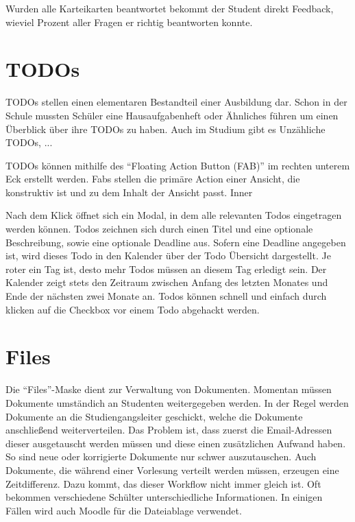Wurden alle Karteikarten beantwortet bekommt der Student direkt Feedback, wieviel Prozent aller Fragen er richtig beantworten konnte.


\section{TODOs}\label{sec:TODOs} %
TODOs stellen einen elementaren Bestandteil einer Ausbildung dar.
Schon in der Schule mussten Schüler eine Hausaufgabenheft oder Ähnliches führen um einen Überblick über ihre TODOs zu haben.
Auch im Studium gibt es Unzähliche TODOs, ...

TODOs können mithilfe des \enquote{Floating Action Button (FAB)} im rechten unterem Eck erstellt werden. %
Fabs stellen die primäre Action einer Ansicht, die konstruktiv ist und zu dem Inhalt der Ansicht passt.
Inner


Nach dem Klick öffnet sich ein Modal, in dem alle relevanten Todos eingetragen werden können.
Todos zeichnen sich durch einen Titel und eine optionale Beschreibung, sowie eine optionale Deadline aus.
Sofern eine Deadline angegeben ist, wird dieses Todo in den Kalender über der Todo Übersicht dargestellt.
Je roter ein Tag ist, desto mehr Todos müssen an diesem Tag erledigt sein.
Der Kalender zeigt stets den Zeitraum zwischen Anfang des letzten Monates und Ende der nächsten zwei Monate  an.
Todos können schnell und einfach durch klicken auf die Checkbox vor einem Todo abgehackt werden.









\section{Files}
Die \enquote{Files}-Maske dient zur Verwaltung von Dokumenten.
Momentan müssen Dokumente umständich an Studenten weitergegeben werden.
In der Regel werden Dokumente an die Studiengangsleiter geschickt, welche die Dokumente anschließend weiterverteilen.
Das Problem ist, dass zuerst die Email-Adressen dieser ausgetauscht werden müssen und diese einen zusätzlichen Aufwand haben.
So sind neue oder korrigierte Dokumente nur schwer auszutauschen.
Auch Dokumente, die während einer Vorlesung verteilt werden müssen, erzeugen eine Zeitdifferenz.
Dazu kommt, das dieser Workflow nicht immer gleich ist.
Oft bekommen verschiedene Schülter unterschiedliche Informationen.
In einigen Fällen wird auch Moodle für die Dateiablage verwendet.

